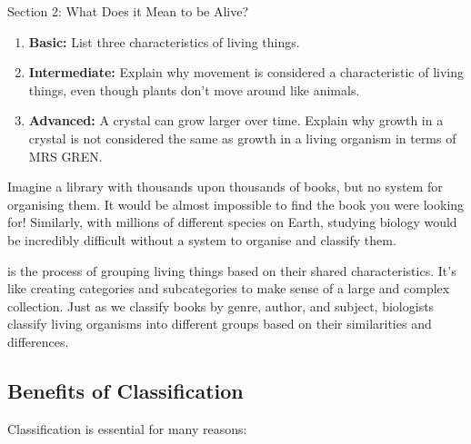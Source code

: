 \begin{tieredquestions}{Section 2: What Does it Mean to be Alive?}
\begin{enumerate}
    \item \textbf{Basic:} List three characteristics of living things.
    \item \textbf{Intermediate:} Explain why movement is considered a characteristic of living things, even though plants don't move around like animals.
    \item \textbf{Advanced:}  A crystal can grow larger over time.  Explain why growth in a crystal is not considered the same as growth in a living organism in terms of MRS GREN.
\end{enumerate}
\end{tieredquestions}


\FloatBarrier

Imagine a library with thousands upon thousands of books, but no system for organising them.  It would be almost impossible to find the book you were looking for!  Similarly, with millions of different species on Earth, studying biology would be incredibly difficult without a system to organise and classify them.

 is the process of grouping living things based on their shared characteristics. It's like creating categories and subcategories to make sense of a large and complex collection.  Just as we classify books by genre, author, and subject, biologists classify living organisms into different groups based on their similarities and differences.

\subsection{Benefits of Classification}

Classification is essential for many reasons:

